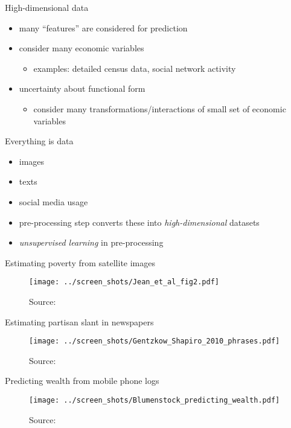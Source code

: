 \documentclass[xcolor=dvipsnames, handout]{beamer}
\begin{document}
\begin{frame}{High-dimensional data}
\begin{itemize}
  \item many ``features'' are considered for prediction
  \pause\item consider many economic variables 
  \begin{itemize}
    \item examples: detailed census data, social network activity
  \end{itemize}
  \pause\item uncertainty about functional form 
  \begin{itemize}
    \item consider many transformations/interactions of small set of economic variables
  \end{itemize}
\end{itemize}
\end{frame}


\begin{frame}{Everything is data}
\begin{itemize}
  \item images 
  \item texts 
  \item social media usage 
  \pause
  \item pre-processing step converts these into \emph{high-dimensional} datasets
  \item \emph{unsupervised learning} in pre-processing  
\end{itemize}
\end{frame}

\begin{frame}{Estimating poverty from satellite images}
\begin{figure}
  \texttt{[image: ../screen\_shots/Jean\_et\_al\_fig2.pdf]}
   \caption{Source: \textcite{jean2016combining}}
\end{figure}
\end{frame}


\begin{frame}{Estimating partisan slant in newspapers}
\begin{figure}
  \texttt{[image: ../screen\_shots/Gentzkow\_Shapiro\_2010\_phrases.pdf]}
   \caption{Source: \textcite{gentzkow2010drives}}
\end{figure}
\end{frame}


\begin{frame}{Predicting wealth from mobile phone logs}
\begin{figure}
  \texttt{[image: ../screen\_shots/Blumenstock\_predicting\_wealth.pdf]}
   \caption{Source: \textcite{blumenstock2015predicting}}
\end{figure}
\end{frame}
\end{document}
